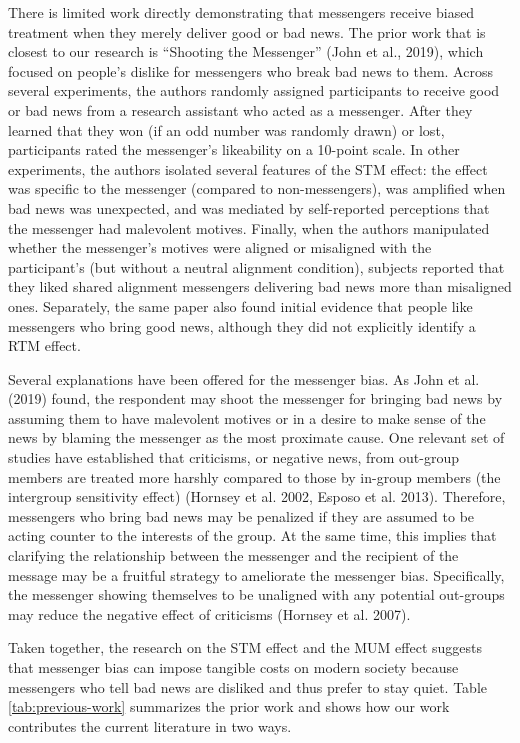 There is limited work directly demonstrating that messengers receive
biased treatment when they merely deliver good or bad news. The prior
work that is closest to our research is ``Shooting the Messenger''
(John et al., 2019), which focused on people's dislike for messengers
who break bad news to them. Across several experiments, the authors
randomly assigned participants to receive good or bad news from a
research assistant who acted as a messenger. After they learned that
they won (if an odd number was randomly drawn) or lost, participants
rated the messenger's likeability on a 10-point scale. In other
experiments, the authors isolated several features of the STM effect:
the effect was specific to the messenger (compared to non-messengers),
was amplified when bad news was unexpected, and was mediated by
self-reported perceptions that the messenger had malevolent motives.
Finally, when the authors manipulated whether the messenger's motives
were aligned or misaligned with the participant's (but without a neutral
alignment condition), subjects reported that they liked shared alignment
messengers delivering bad news more than misaligned ones. Separately,
the same paper also found initial evidence that people like messengers
who bring good news, although they did not explicitly identify a RTM
effect.

Several explanations have been offered for the messenger bias. As John
et al. (2019) found, the respondent may shoot the messenger for bringing
bad news by assuming them to have malevolent motives or in a desire to
make sense of the news by blaming the messenger as the most proximate
cause. One relevant set of studies have established that criticisms, or
negative news, from out-group members are treated more harshly compared
to those by in-group members (the intergroup sensitivity effect)
(Hornsey et al. 2002, Esposo et al. 2013). Therefore, messengers who
bring bad news may be penalized if they are assumed to be acting counter
to the interests of the group. At the same time, this implies that
clarifying the relationship between the messenger and the recipient of
the message may be a fruitful strategy to ameliorate the messenger bias.
Specifically, the messenger showing themselves to be unaligned with any
potential out-groups may reduce the negative effect of criticisms
(Hornsey et al. 2007).




Taken together, the research on the STM effect and the MUM effect
suggests that messenger bias can impose tangible costs on modern society
because messengers who tell bad news are disliked and thus prefer to
stay quiet. Table \ref{tab:previous-work} summarizes the prior work and shows how our work
contributes the current literature in two ways.


